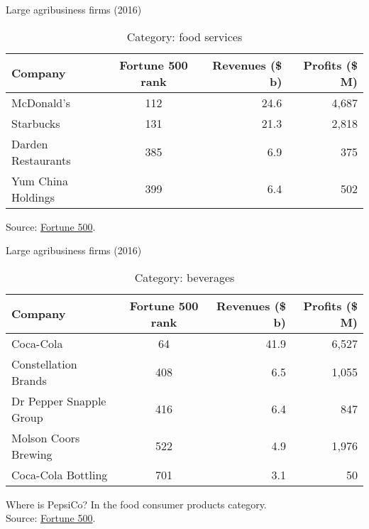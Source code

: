 \documentclass[table,xcolor=pdftex,dvipsnames]{beamer}\usepackage[]{graphicx}\usepackage[]{color}
\begin{document}

\begin{frame}{Large agribusiness firms (2016)}
\begin{table}
\caption{Category: food services}
\begin{tabular}{l c r r}
  \toprule
  Company & \parbox[c]{0.75in}{Fortune 500 rank} & \parbox[c]{0.65in}{\centering Revenues (\$ b)} & \parbox[c]{0.60in}{\centering Profits (\$ M)}\\
  \midrule
  McDonald's & 112 & 24.6 & 4,687 \\
  Starbucks & 131 & 21.3 & 2,818 \\
  Darden Restaurants & 385 & 6.9 & 375 \\
  Yum China Holdings & 399 & 6.4 & 502 \\
  \bottomrule
\end{tabular}
\end{table}
Source: \href{http://fortune.com/fortune500/}{Fortune 500}.
\end{frame}


\begin{frame}{Large agribusiness firms (2016)}
\begin{table}
\caption{Category: beverages}
\begin{tabular}{l c r r}
  \toprule
  Company & \parbox[c]{0.75in}{Fortune 500 rank} & \parbox[c]{0.65in}{\centering Revenues (\$ b)} & \parbox[c]{0.60in}{\centering Profits (\$ M)}\\
  \midrule
  Coca-Cola & 64 & 41.9 & 6,527 \\
  Constellation Brands & 408 & 6.5 & 1,055 \\
  Dr Pepper Snapple Group & 416 & 6.4 & 847 \\
  Molson Coors Brewing & 522 & 4.9 & 1,976 \\
  Coca-Cola Bottling & 701 & 3.1 & 50 \\
  \bottomrule
\end{tabular}
\end{table}
Where is PepsiCo? In the food consumer products category.\\
Source: \href{http://fortune.com/fortune500/}{Fortune 500}.
\end{frame}

\end{document}
